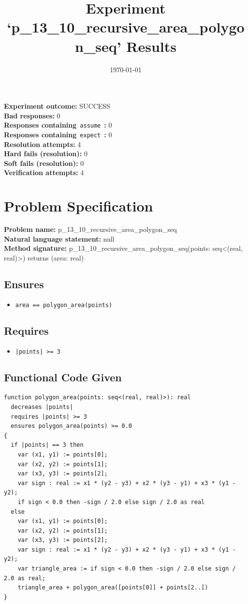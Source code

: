 \documentclass{article}
\begin{document}
\title{Experiment `p\_13\_10\_recursive\_area\_polygon\_seq' Results}
\author{\today}
\date{}
\maketitle
\textbf{Experiment outcome: }SUCCESS
\\\textbf{Bad responses: }0
\\\textbf{Responses containing}~\texttt{assume}~\textbf{: }0
\\\textbf{Responses containing}~\texttt{expect}~\textbf{: }0
\\\textbf{Resolution attempts: }4
\\\textbf{Hard fails (resolution): }0
\\\textbf{Soft fails (resolution): }0
\\\textbf{Verification attempts: }4
\section*{Problem Specification}
\textbf{Problem name: }p\_13\_10\_recursive\_area\_polygon\_seq
\\\textbf{Natural language statement: }null
\\\textbf{Method signature: }p\_13\_10\_recursive\_area\_polygon\_seq(points: seq<(real, real)>) returns (area: real)
\subsection*{Ensures}
\begin{itemize}
\item \texttt{area == polygon\_area(points)}
\end{itemize}
\subsection*{Requires}
\begin{itemize}
\item \texttt{|points| >= 3}
\end{itemize}
\subsection*{Functional Code Given}
\begin{lstlisting}
function polygon_area(points: seq<(real, real)>): real
  decreases |points|
  requires |points| >= 3
  ensures polygon_area(points) >= 0.0
{
  if |points| == 3 then 
    var (x1, y1) := points[0];
    var (x2, y2) := points[1];
    var (x3, y3) := points[2];
    var sign : real := x1 * (y2 - y3) + x2 * (y3 - y1) + x3 * (y1 - y2);
    if sign < 0.0 then -sign / 2.0 else sign / 2.0 as real 
  else 
    var (x1, y1) := points[0];
    var (x2, y2) := points[1];
    var (x3, y3) := points[2];
    var sign : real := x1 * (y2 - y3) + x2 * (y3 - y1) + x3 * (y1 - y2);
    var triangle_area := if sign < 0.0 then -sign / 2.0 else sign / 2.0 as real;
    triangle_area + polygon_area([points[0]] + points[2..])
}
\end{lstlisting}
\clearpage
\end{document}
